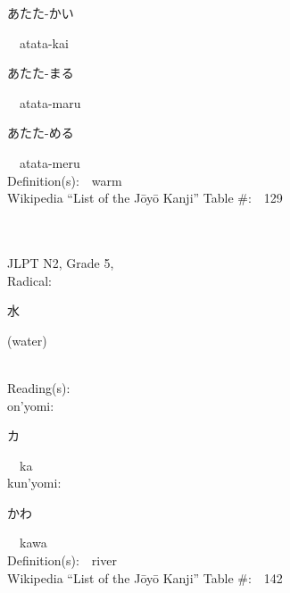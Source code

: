 \begin{multicols}{2}
{\hspace*{2em}}{\begin{CJK}{UTF8}{min} あたた-かい \end{CJK}}\ \ atata-kai\ \ \\
{\hspace*{2em}}{\begin{CJK}{UTF8}{min} あたた-まる \end{CJK}}\ \ atata-maru\ \ \\
{\hspace*{2em}}{\begin{CJK}{UTF8}{min} あたた-める \end{CJK}}\ \ atata-meru\ \ \\
Definition(s):\ \ warm \\
Wikipedia ``List of the J\=oy\=o Kanji'' Table \#:\ \ 129 \\
\ \ \\
{\fontsize{34pt}{40pt}  }\ \ \\  %
{JLPT N2, Grade 5, \\Radical:\ \ {\begin{CJK}{UTF8}{min} 水 \end{CJK}} (water) } \\
Reading(s):\ \ \\
{\hspace*{1em}}on'yomi:\ \ \\
{\hspace*{2em}}{\begin{CJK}{UTF8}{min} カ \end{CJK}}\ \ ka\ \ \\
{\hspace*{1em}}kun'yomi:\ \ \\
{\hspace*{2em}}{\begin{CJK}{UTF8}{min} かわ \end{CJK}}\ \ kawa\ \ \\
Definition(s):\ \ river \\
Wikipedia ``List of the J\=oy\=o Kanji'' Table \#:\ \ 142 \\
\ \ \\
{\fontsize{34pt}{40pt}  }\ \ \\  %

\end{multicols}
